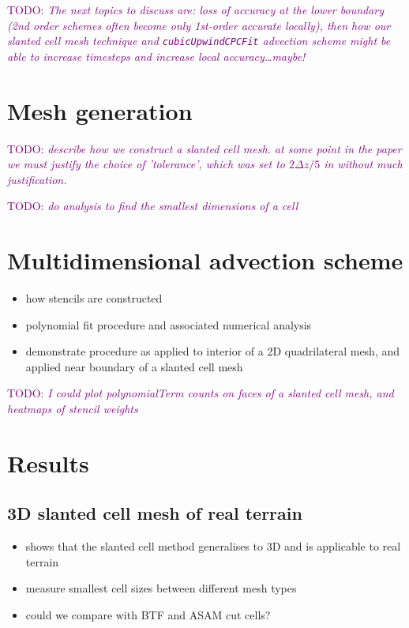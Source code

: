 \documentclass{article}
\newcommand{\TODO}[1]{\textcolor{purple}{TODO: \emph{#1}}}
\begin{document}
\vspace*{2em}


\TODO{The next topics to discuss are: loss of accuracy at the lower boundary (2nd order schemes often become only 1st-order accurate locally), then how our slanted cell mesh technique and \texttt{cubicUpwindCPCFit} advection scheme might be able to increase timesteps and increase local accuracy\ldots maybe!}

\section{Mesh generation}
\TODO{describe how we construct a slanted cell mesh.  at some point in the paper we must justify the choice of 'tolerance', which was set to $2\Delta z/5$ in \citet{shaw-weller2016} without much justification.}

\TODO{do analysis to find the smallest dimensions of a cell}

\section{Multidimensional advection scheme}
\begin{itemize}
	\item how stencils are constructed
	\item polynomial fit procedure and associated numerical analysis
	\item demonstrate procedure as applied to interior of a 2D quadrilateral mesh, and applied near boundary of a slanted cell mesh
\end{itemize}

\TODO{I could plot polynomialTerm counts on faces of a slanted cell mesh, and heatmaps of stencil weights}

\section{Results}

\subsection{3D slanted cell mesh of real terrain}
\begin{itemize}
	\item shows that the slanted cell method generalises to 3D and is applicable to real terrain
	\item measure smallest cell sizes between different mesh types
	\item could we compare with BTF and ASAM cut cells?
\end{itemize}
\end{document}

